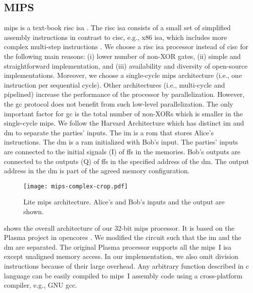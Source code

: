 \subsection{MIPS}\label{ssec:processor-mips}
\gls{mips} is a text-book \acrfull{risc} \acrshort{isa} \cite{kane1992mips}.
The \acrshort{risc} \acrshort{isa} consists of a small set of simplified assembly instructions in contrast to \acrfull{cisc}, e.g., x86 \acrshort{isa}, which includes more complex multi-step instructions \cite{hennessy2012computer}.
We choose a \acrshort{risc} \acrshort{isa} processor instead of \acrshort{cisc} for the following main reasons: (i) lower number of non-XOR gates, (ii) simple and straightforward implementation, and (iii) availability and diversity of open-source implementations.
Moreover, we choose a single-cycle \gls{mips} architecture (i.e., one instruction per sequential cycle).
Other architectures (i.e., multi-cycle and pipelined) increase the performance of the processor by parallelization.
However, the \acrshort{gc} protocol does not benefit from such low-level parallelization.
The only important factor for \acrshort{gc} is the total number of non-XORs which is smaller in the single-cycle \gls{mips}.
We follow the Harvard Architecture which has distinct \acrfull{im} and \acrfull{dm} to separate the parties' inputs.
The \acrshort{im} is a \acrfull{rom} that stores Alice's instructions.
The \acrshort{dm} is a \acrfull{ram} initialized with Bob's input.
The parties' inputs are connected to the initial signals (I) of \acrshort{ff}s in the memories.
Bob's outputs are connected to the outputs (Q) of \acrshort{ff}s in the specified address of the \acrshort{dm}.
The output address in the \acrshort{dm} is part of the agreed memory configuration.

\begin{figure}
\centering
\texttt{[image: mips-complex-crop.pdf]}
\caption{Lite \gls{mips} architecture.
  Alice's and Bob's inputs and the output are shown.}\label{figure:mips}
\end{figure}

 shows the overall architecture of our 32-bit \gls{mips} processor.
It is based on the Plasma project in opencores \cite{rhoads2006plasma}.
We modified the circuit such that the \acrshort{im} and the \acrshort{dm} are separated.
The original Plasma processor supports all the \gls{mips}~I \acrshort{isa} except unaligned memory access.
In our implementation, we also omit division instructions because of their large overhead.
Any arbitrary function described in \gls{c} language can be easily compiled to \gls{mips}~I assembly code using a cross-platform compiler, e.g., GNU gcc.

